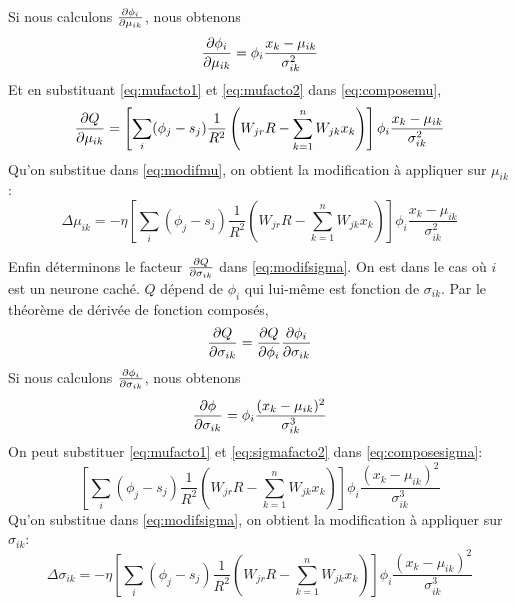 Si nous calculons $\frac{\partial \phi_i}{\partial \mu_{ik}}$, nous obtenons
\begin{equation}\label{eq:mufacto2}
 \frac{\partial \phi_i}{\partial \mu_{ik}} = \phi_i \frac{x_k-\mu_{ik}}{\sigma_{ik}^2}
\end{equation}
Et en substituant \eqref{eq:mufacto1} et \eqref{eq:mufacto2} dans \eqref{eq:composemu},
\[\frac{\partial Q}{\partial \mu_{ik}} = \left[\sum_{i}(\phi_j - s_j) \frac{1}{R^2} \left(W_{jr}R - \sum_{k=1}^{n}W_{jk}x_k\right)\right] \phi_i\frac{x_k-\mu_{ik}}{\sigma_{ik}^2}\]
Qu'on substitue dans \eqref{eq:modifmu}, on obtient la modification à appliquer sur $\mu_{ik}$:
\[\Delta\mu_{ik} = -\eta \left[\sum_{i}(\phi_j - s_j) \frac{1}{R^2} \left(W_{jr}R - \sum_{k=1}^{n}W_{jk}x_k\right)\right] \phi_i\frac{x_k-\mu_{ik}}{\sigma_{ik}^2}\]

Enfin déterminons le facteur $\frac{\partial Q}{\partial \sigma_{ik}}$ dans \eqref{eq:modifsigma}. On est dans le cas où $i$ est un neurone caché.
$Q$ dépend de $\phi_i$ qui lui-même est fonction de $\sigma_{ik}$. Par le théorème de dérivée de fonction composés,
\begin{equation}\label{eq:composesigma}
 \frac{\partial Q}{\partial \sigma_{ik}} = \frac{\partial Q}{\partial \phi_i} \frac{\partial \phi_i}{\partial \sigma_{ik}}
\end{equation}
Si nous calculons $\frac{\partial \phi_i}{\partial \sigma_{ik}}$, nous obtenons
\begin{equation}\label{eq:sigmafacto2}
 \frac{\partial \phi}{\partial \sigma_{ik}} = \phi_i \frac{(x_k-\mu_{ik})^2}{\sigma_{ik}^3}
\end{equation}
On peut substituer \eqref{eq:mufacto1} et \eqref{eq:sigmafacto2} dans \eqref{eq:composesigma}:
\[\left[\sum_{i}(\phi_j - s_j) \frac{1}{R^2} \left(W_{jr}R - \sum_{k=1}^{n}W_{jk}x_k\right)\right] \phi_i \frac{(x_k-\mu_{ik})^2}{\sigma_{ik}^3}\]
Qu'on substitue dans \eqref{eq:modifsigma}, on obtient la modification à appliquer sur $\sigma_{ik}$:
\[\Delta \sigma_{ik} = -\eta \left[\sum_{i}(\phi_j - s_j) \frac{1}{R^2} \left(W_{jr}R - \sum_{k=1}^{n}W_{jk}x_k\right)\right] \phi_i \frac{(x_k-\mu_{ik})^2}{\sigma_{ik}^3}\]